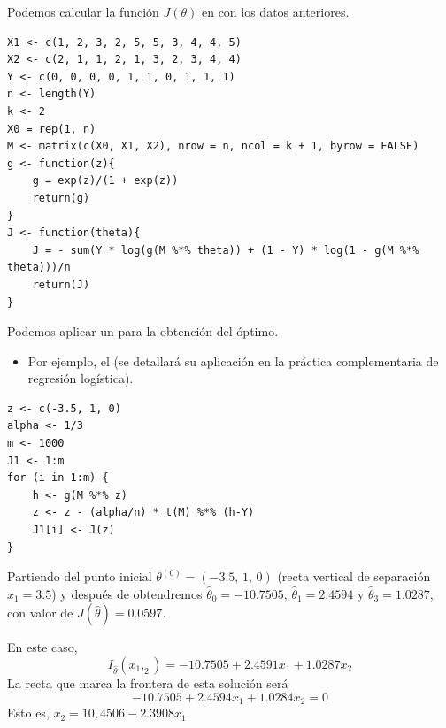 Podemos calcular la función $J(\theta)$ en  con los datos anteriores.
\pagebreak
\begin{lstlisting}
X1 <- c(1, 2, 3, 2, 5, 5, 3, 4, 4, 5)
X2 <- c(2, 1, 1, 2, 1, 3, 2, 3, 4, 4)
Y <- c(0, 0, 0, 0, 1, 1, 0, 1, 1, 1)
n <- length(Y)
k <- 2
X0 = rep(1, n)
M <- matrix(c(X0, X1, X2), nrow = n, ncol = k + 1, byrow = FALSE)
g <- function(z){
	g = exp(z)/(1 + exp(z))
	return(g)
}
J <- function(theta){
	J = - sum(Y * log(g(M %*% theta)) + (1 - Y) * log(1 - g(M %*% theta)))/n
	return(J)
}
\end{lstlisting}
Podemos aplicar un  para la obtención del óptimo.
\begin{itemize}
	\item Por ejemplo, el  (se detallará su aplicación en la práctica complementaria de regresión logística).
\end{itemize}
\begin{lstlisting}
z <- c(-3.5, 1, 0)
alpha <- 1/3
m <- 1000
J1 <- 1:m
for (i in 1:m) {
	h <- g(M %*% z)
	z <- z - (alpha/n) * t(M) %*% (h-Y)
	J1[i] <- J(z)
}
\end{lstlisting}
Partiendo del punto inicial $\theta^{(0)}=(-3.5,\,1,\,0)$ (recta vertical de separación $x_1=3.5$) y después de  obtendremos $\hat{\theta}_0=-10.7505,\,\hat{\theta}_1=2.4594$ y $\hat{\theta}_3=1.0287$, con valor de $J(\hat{\theta})=0.0597$.

En este caso,\[ I_{\hat{\theta}}(x_1,_2)=-10.7505+2.4591x_1+1.0287x_2 \]
La recta que marca la frontera de esta solución será\[ -10.7505+2.4594x_1+1.0284x_2=0 \]
Esto es, $x_2=10,4506-2.3908x_1$